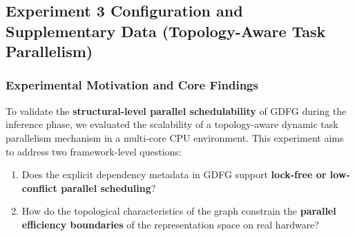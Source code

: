 \begin{table}[htbp]
    \centering
    \caption{Performance comparison for Task 3 in Experiment 3. Evolution column: \checkmark = Method pool evolution enabled, \texttimes = Disabled, --- = Static injection baseline.}
    \label{tab:exp3_results}
\end{table}

\subsection{Experiment 3 Configuration and Supplementary Data (Topology-Aware Task Parallelism)}
\label{sec:appendix_exp3}

\subsubsection{Experimental Motivation and Core Findings}
To validate the \textbf{structural-level parallel schedulability} of GDFG during the inference phase, we evaluated the scalability of a topology-aware dynamic task parallelism mechanism in a multi-core CPU environment. This experiment aims to address two framework-level questions:
\begin{enumerate}
    \item Does the explicit dependency metadata in GDFG support \textbf{lock-free or low-conflict parallel scheduling}?
    \item How do the topological characteristics of the graph constrain the \textbf{parallel efficiency boundaries} of the representation space on real hardware?
\end{enumerate}

